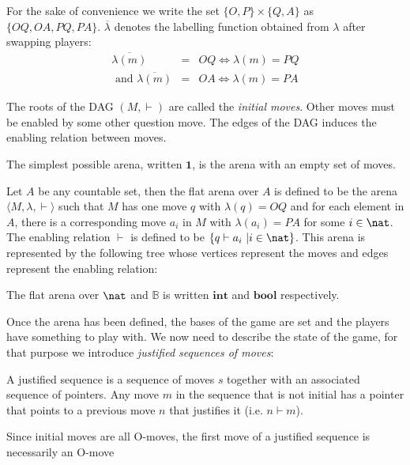 For the sake of convenience we write the set $\{O,P\} \times
\{Q,A\}$ as $\{OQ,OA,PQ,PA\}$. $\overline{\lambda}$ denotes the
labelling function obtained from $\lambda$ after swapping players:
\begin{eqnarray*}
\overline{\lambda(m)} &=& OQ \iff \lambda(m) = PQ \\
\mbox{ and } \overline{\lambda(m)} &=& OA \iff \lambda(m) = PA
\end{eqnarray*}

The roots of the DAG $(M,\vdash)$ are called the \emph{initial moves}.
Other moves must be enabled by some other question move. The edges of the DAG induces the enabling relation between moves.

The simplest possible arena, written $\mathbf{1}$, is the arena with an empty set of moves.

\begin{example}
\label{exmp:flatarena}

 Let $A$ be any countable set, then the flat arena over $A$
is defined to be the arena $\langle M, \lambda, \vdash \rangle$ such
that $M$ has one move $q$ with $\lambda(q) = OQ$ and for each
element in $A$, there is a corresponding move $a_i$ in $M$ with
$\lambda(a_i) = PA$ for some $i \in \nat$. The enabling relation
$\vdash$ is defined to be $\{ q \vdash a_i \ | i \in \nat \}$.
This arena is represented by the following tree whose vertices represent the moves and edges represent the enabling relation:
\begin{center}
  \pssetarena{}
    {      \TR{\ldots} }
\end{center}
The flat arena over $\nat$ and $\mathbb{B}$ is written
$\mathbf{int}$ and  $\mathbf{bool}$ respectively.
\end{example}

Once the arena has been defined, the bases of the game are set and the players have something to play with.
We now need to describe the state of the game, for that purpose
we introduce \emph{justified sequences of moves}:
\begin{definition}
A justified sequence is a sequence of moves $s$ together with an
associated sequence of pointers. Any move $m$ in the sequence that
is not initial has a pointer that points to a previous move $n$ that
justifies it (i.e. $n \vdash m$).
\end{definition}
Since initial moves are all O-moves, the first move of a justified
sequence is necessarily an O-move

